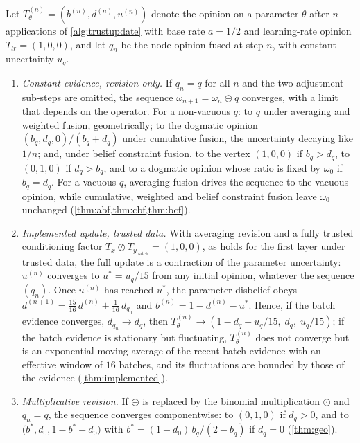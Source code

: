 \begin{theorem}\label{thm:convergence}
Let $T_\theta^{(n)} = (b^{(n)}, d^{(n)}, u^{(n)})$ denote the opinion on a parameter $\theta$ after $n$ applications of \cref{alg:trustupdate} with base rate $a = 1/2$ and learning-rate opinion $T_{lr} = (1,0,0)$, and let $q_n$ be the node opinion fused at step $n$, with constant uncertainty $u_q$.
\begin{enumerate}
    \item \emph{Constant evidence, revision only.} If $q_n = q$ for all $n$ and the two adjustment sub-steps are omitted, the sequence $\omega_{n+1} = \omega_n \circleddash q$ converges, with a limit that depends on the operator. For a non-vacuous $q$: to $q$ under averaging and weighted fusion, geometrically; to the dogmatic opinion $(b_q, d_q, 0)/(b_q + d_q)$ under cumulative fusion, the uncertainty decaying like $1/n$; and, under belief constraint fusion, to the vertex $(1,0,0)$ if $b_q > d_q$, to $(0,1,0)$ if $d_q > b_q$, and to a dogmatic opinion whose ratio is fixed by $\omega_0$ if $b_q = d_q$. For a vacuous $q$, averaging fusion drives the sequence to the vacuous opinion, while cumulative, weighted and belief constraint fusion leave $\omega_0$ unchanged (\cref{thm:abf,thm:cbf,thm:bcf}).
    \item \emph{Implemented update, trusted data.} With averaging revision and a fully trusted conditioning factor $T_x \oslash T_{y_\text{batch}} = (1,0,0)$, as holds for the first layer under trusted data, the full update is a contraction of the parameter uncertainty: $u^{(n)}$ converges to $u^* = u_q / 15$ from any initial opinion, whatever the sequence $(q_n)$. Once $u^{(n)}$ has reached $u^*$, the parameter disbelief obeys $d^{(n+1)} = \tfrac{15}{16}\, d^{(n)} + \tfrac{1}{16}\, d_{q_n}$ and $b^{(n)} = 1 - d^{(n)} - u^*$. Hence, if the batch evidence converges, $d_{q_n} \to d_q$, then $T_\theta^{(n)} \to (1 - d_q - u_q/15,\; d_q,\; u_q/15)$; if the batch evidence is stationary but fluctuating, $T_\theta^{(n)}$ does not converge but is an exponential moving average of the recent batch evidence with an effective window of $16$ batches, and its fluctuations are bounded by those of the evidence (\cref{thm:implemented}).
    \item \emph{Multiplicative revision.} If $\circleddash$ is replaced by the binomial multiplication $\odot$ and $q_n = q$, the sequence converges componentwise: to $(0, 1, 0)$ if $d_q > 0$, and to $\big(b^*, d_0, 1 - b^* - d_0\big)$ with $b^* = (1 - d_0)\, b_q / (2 - b_q)$ if $d_q = 0$ (\cref{thm:geo}).
\end{enumerate}
\end{theorem}

